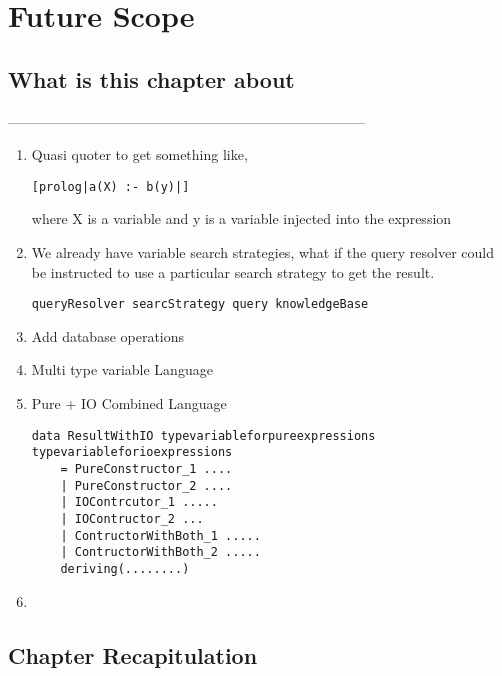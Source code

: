 \documentclass[thesis-solanki.tex]{subfiles}
\begin{document}
\chapter{Future Scope}\label{chap:futureScope}


\section{What is this chapter about}

-----------------------------------------------------------------------------


\begin{enumerate}

\item Quasi quoter to get something like,
\begin{verbatim}
[prolog|a(X) :- b(y)|]
\end{verbatim}
where X is a   variable and y is a  variable injected into the expression


\item We already have variable search strategies, what if the query resolver could be instructed to use a particular search strategy to get 
the result.
\begin{verbatim}
queryResolver searcStrategy query knowledgeBase
\end{verbatim}


\item Add database operations

\item Multi type variable Language

\item Pure + IO Combined Language

\begin{verbatim}
data ResultWithIO typevariableforpureexpressions typevariableforioexpressions
	= PureConstructor_1 ....
	| PureConstructor_2 ....
	| IOContrcutor_1 .....
	| IOContructor_2 ...
	| ContructorWithBoth_1 .....
	| ContructorWithBoth_2 .....
	deriving(........)
\end{verbatim}

\item 

\end{enumerate}


\section{Chapter Recapitulation}

\ifMain
\begin{scope}
  \nolinenumbers
  \enotesize
  \par
  \begin{singlespace}
  \setlength{\parskip}{12pt plus 2pt minus 1pt}
  \theendnotes
  \par
  \end{singlespace}
\end{scope}
\fi
\end{document}
